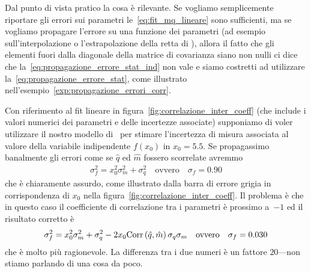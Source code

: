 
Dal punto di vista pratico la cosa è rilevante. Se vogliamo semplicemente
riportare gli errori sui parametri le~\eqref{eq:fit_mq_lineare} sono
sufficienti, ma se vogliamo propagare l'errore su una funzione dei
parametri (ad esempio sull'interpolazione o l'estrapolazione della retta di
\bestfit), allora il fatto che gli elementi fuori dalla diagonale della
matrice di covarianza siano non nulli ci dice che
la~\eqref{eq:propagazione_errore_stat_ind} non vale e siamo costretti ad
utilizzare la~\eqref{eq:propagazione_errore_stat}, come illustrato
nell'esempio~\ref{exp:propagazione_errori_corr}.

\begin{examplebox}
  \begin{example}\label{exp:propagazione_errori_corr}
    Con riferimento al fit lineare in figura~\ref{fig:correlazione_inter_coeff}
    (che include i valori numerici dei parametri e delle incertezze associate)
    supponiamo di voler utilizzare il nostro modello di \bestfit\ per
    stimare l'incertezza di misura associata al valore della variabile
    indipendente $f(x_0)$ in $x_0 = 5.5$. Se propagassimo banalmente gli errori
    come se $\hat{q}$ ed $\hat{m}$ fossero scorrelate avremmo
    \begin{align}
      \sigma^2_f = x_0^2 \sigma_m^2 + \sigma_q^2 \quad \text{ovvero} \quad
      \sigma_f = 0.90
    \end{align}
    che è chiaramente assurdo, come illustrato dalla barra di errore grigia
    in corrispondenza di $x_0$ nella figura~\ref{fig:correlazione_inter_coeff}.
    Il problema è che in questo caso il coefficiente di correlazione tra i
    parametri è prossimo a~$-1$ ed il risultato corretto è
    \begin{align}
      \sigma^2_f = x_0^2 \sigma_m^2 + \sigma_q^2 -
      2x_0\text{Corr}\left(\hat{q}, \hat{m}\right)\sigma_q\sigma_m
      \quad \text{ovvero} \quad
      \sigma_f = 0.030
    \end{align}
    che è molto più ragionevole. La differenza tra i due numeri è un
    fattore $20$---non stiamo parlando di una cosa da poco.
  \end{example}
\end{examplebox}


